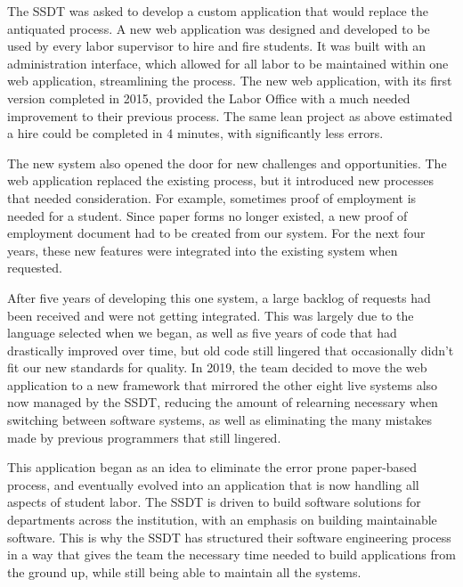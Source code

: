 The SSDT was asked to develop a custom application that would replace the antiquated process. A new web application was designed and developed to be used by every labor supervisor to hire and fire students. It was built with an administration interface, which allowed for all labor to be maintained within one web application, streamlining the process. The new web application, with its first version completed in 2015, provided the Labor Office with a much needed improvement to their previous process. The same lean project as above estimated a hire could be completed in 4 minutes, with significantly less errors.

The new system also opened the door for new challenges and opportunities. The web application replaced the existing process, but it introduced new processes that needed consideration. For example, sometimes proof of employment is needed for a student. Since paper forms no longer existed, a new proof of employment document had to be created from our system. For the next four years, these new features were integrated into the existing system when requested.

After five years of developing this one system, a large backlog of requests had been received and were not getting integrated. This was largely due to the language selected when we began, as well as five years of code that had drastically improved over time, but old code still lingered that occasionally didn't fit our new standards for quality. In 2019, the team decided to move the web application to a new framework that mirrored the other eight live systems also now managed by the SSDT, reducing the amount of relearning necessary when switching between software systems, as well as eliminating the many mistakes made by previous programmers that still lingered.

This application began as an idea to eliminate the error prone paper-based process, and eventually evolved into an application that is now handling all aspects of student labor. The SSDT is driven to build software solutions for departments across the institution, with an emphasis on building maintainable software. This is why the SSDT has structured their software engineering process in a way that gives the team the necessary time needed to build applications from the ground up, while still being able to maintain all the systems.
